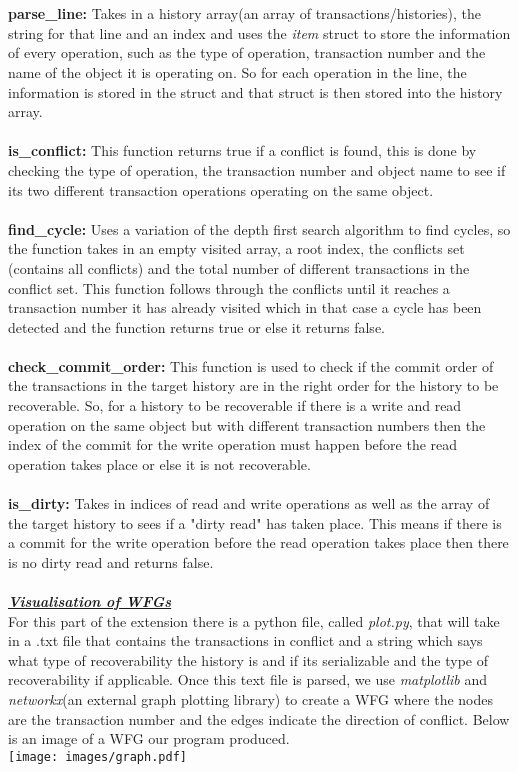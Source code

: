 \documentclass[a4paper]{article}
\begin{document}
\\\\
\textbf{parse\_line: }Takes in a history array(an array of transactions/histories), the string for that line and an index and uses the \textit{item} struct to store the information of every operation, such as the type of operation, transaction number and the name of the object it is operating on. So for each operation in the line, the information is stored in the struct and that struct is then stored into the history array.
\\\\
\textbf{is\_conflict: }This function returns true if a conflict is found, this is done by checking the type of operation, the transaction number and object name to see if its two different transaction operations operating on the same object. 
\\\\
\textbf{find\_cycle: }Uses a variation of the depth first search algorithm to find cycles, so the function takes in an empty visited array, a root index, the conflicts set (contains all conflicts) and the total number of different transactions in the conflict set. This function follows through the conflicts until it reaches a transaction number it has already visited which in that case a cycle has been detected and the function returns true or else it returns false.  
\\\\
\textbf{check\_commit\_order: }This function is used to check if the commit order of the transactions in the target history are in the right order for the history to be recoverable. So, for a history to be recoverable if there is a write and read operation on the same object but with different transaction numbers then the index of the commit for the write operation must happen before the read operation takes place or else it is not recoverable. 
\\\\
\textbf{is\_dirty: }Takes in indices of read and write operations as well as the array of the target history to sees if a "dirty read" has taken place. This means if there is a commit for the write operation before the read operation takes place then there is no dirty read and returns false. 
\\\\
\textbf{\textit{\underline{Visualisation of WFGs}}}\\
For this part of the extension there is a python file, called \textit{plot.py}, that will take in a .txt file that contains the transactions in conflict and a string which says what type of recoverability the history is and if its serializable and the type of recoverability if applicable. Once this text file is parsed, we use \textit{matplotlib} and \textit{networkx}(an external graph plotting library) to create a WFG where the nodes are the transaction number and the edges indicate the direction of conflict. Below is an image of a WFG our program produced. \\
\texttt{[image: images/graph.pdf]}
\end{document}
